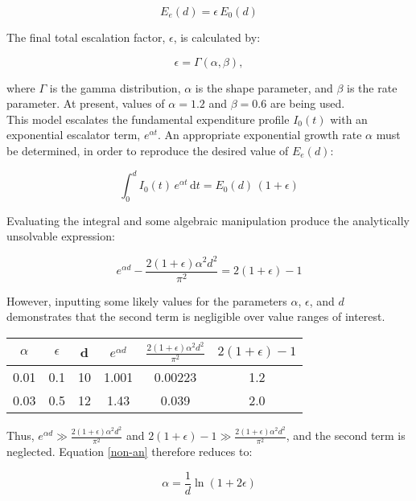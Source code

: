 \documentclass{article}
\begin{document}
\begin{equation}
  E_e(d) = \epsilon \, E_0(d)
\end{equation}

The final total escalation factor, $\epsilon$, is calculated by:

\begin{equation*}
  \epsilon = \Gamma \left( \alpha, \beta \right),
\end{equation*}

where $\Gamma$ is the gamma distribution, $\alpha$ is the shape parameter, and $\beta$ is the rate parameter. At present, values of $\alpha = 1.2$ and $\beta = 0.6$ are being used.\\

This model escalates the fundamental expenditure profile $I_0(t)$ with an exponential escalator term, $e^{\alpha t}$.
An appropriate exponential growth rate $\alpha$ must be determined, in order to reproduce the desired value of $E_e(d)$:

\begin{equation}
  \int_0^d \! {I_0(t) \, e^{\alpha t} \, \mathrm{d}t} = E_0(d) \, \left( 1 + \epsilon \right)
\end{equation}

Evaluating the integral and some algebraic manipulation produce the analytically unsolvable expression:

\begin{equation} \label{non-an}
  e^{\alpha d} - \frac{2 (1 + \epsilon) {\alpha}^2 d^2}{\pi^2} = 2 (1 + \epsilon) - 1
\end{equation}

However, inputting some likely values for the parameters $\alpha$, $\epsilon$, and $d$ demonstrates that the second term is negligible over value ranges of interest.

\begin{center}
\begin{tabular}{| c | c | c | c | c | c |}
  \hline
  $\alpha$ & $\epsilon$ & d & $e^{\alpha d}$ & $\frac{2 (1 + \epsilon) {\alpha}^2 d^2}{\pi^2}$& $2(1 + \epsilon) - 1$  \\ \hline
  0.01 & 0.1 & 10 & 1.001 & 0.00223 & 1.2 \\ \hline
  0.03 & 0.5 & 12 & 1.43 & 0.039 & 2.0 \\ \hline 
\end{tabular}
\end{center}

Thus, $e^{\alpha d} \gg \frac{2 (1 + \epsilon) {\alpha}^2 d^2}{\pi^2}$ and $2(1 + \epsilon) - 1 \gg \frac{2 (1 + \epsilon) {\alpha}^2 d^2}{\pi^2}$, and the second term is neglected. Equation \eqref{non-an} therefore reduces to:

\begin{equation}
  \alpha = \frac{1}{d} \ln \left(1 + 2 \epsilon \right)
\end{equation}
\end{document}
